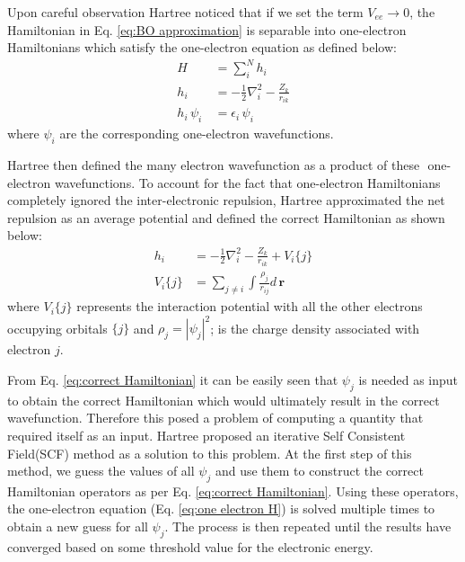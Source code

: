             Upon careful observation Hartree noticed that if we set the term $V_{ee} \to 0$, the Hamiltonian in Eq. \eqref{eq:BO approximation} is separable into one-electron Hamiltonians which satisfy the one-electron \Schrodinger{} equation as defined below:
            \begin{equation}\label{eq:one electron H}
                \begin{aligned}
                    H &= \displaystyle\sum_i^N h_i\\
                    h_i &= -\frac{1}{2} \nabla^2_i - \frac{Z_k}{r_{ik}}\\
                    h_i\,\psi_i\, &= \epsilon_i \, \psi_i
                \end{aligned}
            \end{equation}
            where $\psi_i$ are the corresponding one-electron wavefunctions.

            Hartree then defined the many electron wavefunction as a product of these $\allowbreak$ one-electron wavefunctions. To account for the fact that one-electron Hamiltonians completely ignored the inter-electronic repulsion, Hartree approximated the net repulsion as an average potential and defined the correct Hamiltonian as shown below:
            \begin{equation}\label{eq:correct Hamiltonian}
                \begin{aligned}
                    h_i &= -\frac{1}{2} \nabla^2_i - \frac{Z_k}{r_{ik}} + V_i \{j\}\\
                    V_i \{j\} &= \displaystyle\sum_{j \ne i} \int \frac{\rho_j}{r_{ij}} d\,\mathbf{r}
                \end{aligned}
            \end{equation}
            where $V_i \{j\}$ represents the interaction potential with all the other electrons occupying orbitals $\{j\}$ and $\rho_j = |\psi_j|^2$; is the charge density associated with electron $j$.

            From Eq. \eqref{eq:correct Hamiltonian} it can be easily seen that $\psi_j$ is needed as input to obtain the correct Hamiltonian which would ultimately result in the correct wavefunction. Therefore this posed a problem of computing a quantity that required itself as an input. Hartree proposed an iterative Self Consistent Field(SCF) method as a solution to this problem. At the first step of this method, we guess the values of all $\psi_j$ and use them to construct the correct Hamiltonian operators as per Eq. \eqref{eq:correct Hamiltonian}. Using these operators, the one-electron \Schrodinger{} equation (Eq. \eqref{eq:one electron H}) is solved multiple times to obtain a new guess for all $\psi_j$. The process is then repeated until the results have converged based on some threshold value for the electronic energy.

